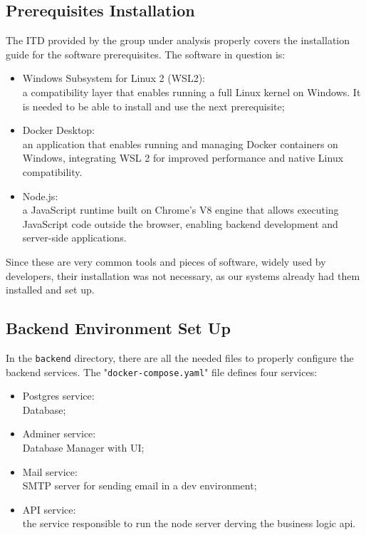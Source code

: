 \subsection{Prerequisites Installation}
The ITD provided by the group under analysis properly covers the installation guide for the software prerequisites.
The software in question is:
\begin{itemize}
    \item Windows Subsystem for Linux 2 (WSL2):\\
         a compatibility layer that enables running a full Linux kernel on Windows. It is needed to be able to install and use the next prerequisite;
    \item Docker Desktop:\\
    an application that enables running and managing Docker containers on Windows, integrating WSL 2 for improved performance and native Linux compatibility.
    \item Node.js:\\
    a JavaScript runtime built on Chrome's V8 engine that allows executing JavaScript code outside the browser, enabling backend development and server-side applications.
\end{itemize}
Since these are very common tools and pieces of software, widely used by developers, their installation was not necessary, as our systems already had them installed and set up.

\subsection{Backend Environment Set Up}

In the \verb|backend| directory, there are all the needed files to properly configure the backend services. The "\verb|docker-compose.yaml|" file defines four services:
\begin{itemize}
    \item Postgres service:\\
        Database;
    \item Adminer service: \\
        Database Manager with UI;
    \item Mail service:\\
        SMTP server for sending email in a dev environment;
    \item API service:\\
        the service responsible to run the node server derving the business logic api.
\end{itemize}

